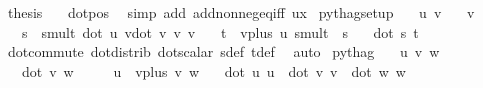\begin{isabellebody}
\ {\isacharquery}{\kern0pt}thesis\ \isamarkupfalse%
\ {}\ dot{\isacharunderscore}{\kern0pt}pos\ \isamarkupfalse%
\ {\isacharparenleft}{\kern0pt}simp\ add{\isacharcolon}{\kern0pt}\ add{\isacharunderscore}{\kern0pt}nonneg{\isacharunderscore}{\kern0pt}eq{\isacharunderscore}{\kern0pt}{}{\isacharunderscore}{\kern0pt}iff\ ux{\isacharparenright}{\kern0pt}\isanewline
{}\isamarkupfalse%
%
\endisatagproof
{\isafoldproof}%
%
\isadelimproof
\isanewline
%
\endisadelimproof
\isanewline
{}\isamarkupfalse%
\ pythag{\isacharunderscore}{\kern0pt}setup{\isacharcolon}{\kern0pt}\isanewline
\ \ \ u\ v\isanewline
\ \ \ {\isachardoublequoteopen}v\ {\isasymnoteq}\ {\isacharparenleft}{\kern0pt}{}{\isacharcomma}{\kern0pt}{}{\isacharcomma}{\kern0pt}{}{\isacharparenright}{\kern0pt}{\isachardoublequoteclose}\isanewline
\ \ \ {\isachardoublequoteopen}s\ {\isasymequiv}\ smult\ {\isacharparenleft}{\kern0pt}{\isacharparenleft}{\kern0pt}dot\ u\ v{\isacharparenright}{\kern0pt}{\isacharslash}{\kern0pt}{\isacharparenleft}{\kern0pt}dot\ v\ v{\isacharparenright}{\kern0pt}{\isacharparenright}{\kern0pt}\ v{\isachardoublequoteclose}\isanewline
\ \ \ {\isachardoublequoteopen}t\ {\isasymequiv}\ vplus\ u\ {\isacharparenleft}{\kern0pt}smult\ {\isacharparenleft}{\kern0pt}{\isacharminus}{\kern0pt}{}{\isacharparenright}{\kern0pt}\ s{\isacharparenright}{\kern0pt}{\isachardoublequoteclose}\isanewline
\ \ \ {\isachardoublequoteopen}dot\ s\ t\ {\isacharequal}{\kern0pt}\ {}{\isachardoublequoteclose}\isanewline
%
\isadelimproof
\ \ %
\endisadelimproof
%
\isatagproof
{}\isamarkupfalse%
\ dot{\isacharunderscore}{\kern0pt}commute\ dot{\isacharunderscore}{\kern0pt}distrib\ dot{\isacharunderscore}{\kern0pt}scalar\ s{\isacharunderscore}{\kern0pt}def\ t{\isacharunderscore}{\kern0pt}def\ \isamarkupfalse%
\ auto%
\endisatagproof
{\isafoldproof}%
%
\isadelimproof
\isanewline
%
\endisadelimproof
\isanewline
\isanewline
{}\isamarkupfalse%
\ pythag{\isacharcolon}{\kern0pt}\isanewline
\ \ \ u\ v\ w\isanewline
\ \ \ {\isachardoublequoteopen}dot\ v\ w\ {\isacharequal}{\kern0pt}\ {}{\isachardoublequoteclose}\isanewline
\ \ \ {\isachardoublequoteopen}u\ {\isacharequal}{\kern0pt}\ vplus\ v\ w{\isachardoublequoteclose}\isanewline
\ \ \ {\isachardoublequoteopen}{\isacharparenleft}{\kern0pt}dot\ u\ u{\isacharparenright}{\kern0pt}\ {\isacharequal}{\kern0pt}\ {\isacharparenleft}{\kern0pt}dot\ v\ v{\isacharparenright}{\kern0pt}\ {\isacharplus}{\kern0pt}\ {\isacharparenleft}{\kern0pt}dot\ w\ w{\isacharparenright}{\kern0pt}{\isachardoublequoteclose}\isanewline

\end{isabellebody}
